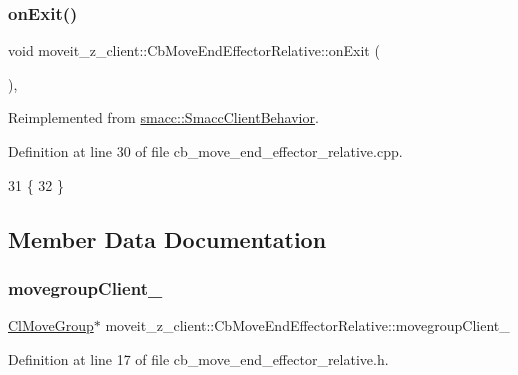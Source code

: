 \subsubsection{\texorpdfstring{on\+Exit()}{onExit()}}
{\footnotesize\ttfamily void moveit\+\_\+z\+\_\+client\+::\+Cb\+Move\+End\+Effector\+Relative\+::on\+Exit (\begin{DoxyParamCaption}{ }\end{DoxyParamCaption})\hspace{0.3cm}{\ttfamily [override]}, {\ttfamily [virtual]}}



Reimplemented from \hyperlink{classsmacc_1_1SmaccClientBehavior_ac0cd72d42bd00425362a97c9803ecce5}{smacc\+::\+Smacc\+Client\+Behavior}.



Definition at line 30 of file cb\+\_\+move\+\_\+end\+\_\+effector\+\_\+relative.\+cpp.


\begin{DoxyCode}
31 \{
32 \}
\end{DoxyCode}


\subsection{Member Data Documentation}
\mbox{\label{classmoveit__z__client_1_1CbMoveEndEffectorRelative_a5f009b3baaaa47ad3be09d43bab33c07}} 
\subsubsection{\texorpdfstring{movegroup\+Client\+\_\+}{movegroupClient\_}}
{\footnotesize\ttfamily \hyperlink{classmoveit__z__client_1_1ClMoveGroup}{Cl\+Move\+Group}$\ast$ moveit\+\_\+z\+\_\+client\+::\+Cb\+Move\+End\+Effector\+Relative\+::movegroup\+Client\+\_\+\hspace{0.3cm}{\ttfamily [protected]}}



Definition at line 17 of file cb\+\_\+move\+\_\+end\+\_\+effector\+\_\+relative.\+h.



